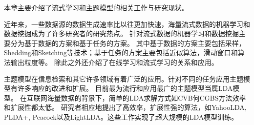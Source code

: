 本章主要介绍了流式学习和主题模型的相关工作与研究现状。

近年来，一些数据源的数据生成速率比以往更加快速，海量流式数据的机器学习和数据挖掘成为了许多研究者的研究热点。
针对流式数据的机器学习和数据挖掘主要分为基于数据的方案和基于任务的方案。
其中基于数据的方案主要包括采样，Shedding和Sketching等技术；基于任务的方案主要包括近似算法，滑动窗口和算法输出粒度等。
除此之外还介绍了在线学习和流式学习的关系和应用。

主题模型在信息检索和其它许多领域有着广泛的应用。针对不同的任务应用主题模型有许多响应的改进和扩展。
目前最为流行和应用最广的主题模型当属LDA模型。
在互联网海量数据的背景下，简单的LDA求解方式如CVB何CGBS方法效率和扩展性都太低。
研究者相应地提出了高效率，扩展性强的算法，如YahooLDA, PLDA+, Peacock以及LightLDA。这些工作实现了超大规模的LDA模型训练。
